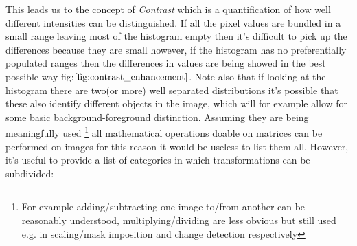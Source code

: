 This leads us to the concept of \textit{Contrast} which is a quantification of how well different intensities can be distinguished. If all the pixel values are bundled in a small range leaving most of the histogram empty then it's difficult to pick up the differences because they are small however, if the histogram has no preferentially populated ranges then the differences in values are being showed in the best possible way fig:$\ref{fig:contrast_enhancement}$. Note also that if looking at the histogram there are two(or more) well separated distributions it's possible that these also identify different objects in the image, which will for example allow for some basic background-foreground distinction.
Assuming they are being meaningfully used \footnote{For example adding/subtracting one image to/from another can be reasonably understood, multiplying/dividing are less obvious but still used e.g. in scaling/mask imposition and change detection respectively} all mathematical operations doable on matrices can be performed on images for this reason it would be useless to list them all. However, it's useful to provide a list of categories in which transformations can be subdivided:

